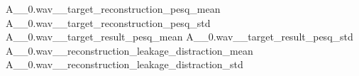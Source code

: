 \constrainingplot
{A__0.wav__target_reconstruction_pesq_mean}
{A__0.wav__target_reconstruction_pesq_std}
{A__0.wav__target_result_pesq_mean}
{A__0.wav__target_result_pesq_std}
{A__0.wav__reconstruction_leakage_distraction_mean}
{A__0.wav__reconstruction_leakage_distraction_std}
